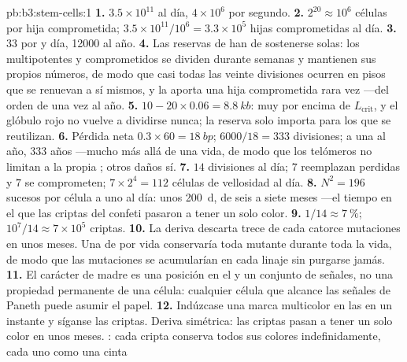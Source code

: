 \begin{solution}{pb:b3:stem-cells:1}
\textbf{1.} $3.5\times 10^{11}$ al día, $4\times 10^{6}$ por segundo.
\textbf{2.} $2^{20} \approx 10^{6}$ células por hija comprometida;
$3.5\times 10^{11}/10^{6} = 3.3\times 10^{5}$ hijas comprometidas al día.
\textbf{3.} $33$ por  y día, \num{12000} al año.
\textbf{4.} Las reservas de  han de sostenerse solas: los
 multipotentes y comprometidos se dividen durante semanas y
mantienen sus propios números, de modo que casi todas las veinte
divisiones ocurren en pisos que se renuevan a sí mismos, y la  aporta una hija comprometida rara vez ---del orden de una vez al
año.
\textbf{5.} $10 - 20\times 0.06 = \qty{8.8}{kb}$: muy por encima de
$L_{\text{crit}}$, y el glóbulo rojo no vuelve a dividirse nunca; la
reserva solo importa para los  que se reutilizan.
\textbf{6.} Pérdida neta $0.3\times 60 = \qty{18}{bp}$; $6000/18 = 333$
divisiones; a una al año, $333$ años ---mucho más allá de una vida, de
modo que los telómeros no limitan a la propia ; otros daños
sí.
\textbf{7.} $14$ divisiones al día; $7$ reemplazan 
perdidas y $7$ se comprometen; $7\times 2^{4} = 112$ células de
vellosidad al día.
\textbf{8.} $N^{2} = 196$ sucesos por célula a uno al día: unos
\qty{200}{d}, de seis a siete meses ---el tiempo en el que las criptas
del confeti pasaron a tener un solo color.
\textbf{9.} $1/14 \approx \qty{7}{\%}$; $10^{7}/14 \approx 7\times 10^{5}$
criptas.
\textbf{10.} La deriva descarta trece de cada catorce mutaciones en unos
meses. Una  de por vida conservaría toda 
mutante durante toda la vida, de modo que las mutaciones se acumularían
en cada linaje sin purgarse jamás.
\textbf{11.} El carácter de madre es una posición en el  y un
conjunto de señales, no una propiedad permanente de una célula:
cualquier célula que alcance las señales de Paneth puede asumir el
papel.
\textbf{12.} Indúzcase una marca multicolor en las  en un
instante y síganse las criptas. Deriva simétrica: las criptas pasan a
tener un solo color en unos meses. : cada cripta
conserva todos sus colores indefinidamente, cada uno como una cinta

\end{solution}

